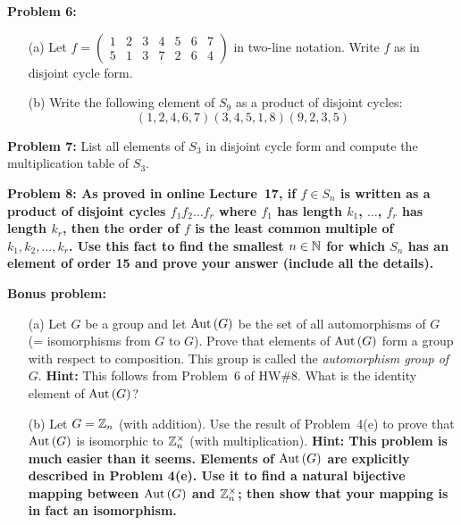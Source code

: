 \documentclass[11pt]{amsart}
\begin{document}
 \skv
{\bf Problem 6:} 
\begin{itemize}
\item[(a)] Let $f=\begin{pmatrix}1 & 2& 3& 4&5 &  6& 7\\
5 & 1& 3& 7&2 &  6& 4 \end{pmatrix}$ in two-line notation. Write $f$ as in disjoint cycle form.

\item[(b)] Write the following element of $S_9$ as a product of disjoint cycles: 
$$(1,2,4,6,7)(3,4,5,1,8)(9,2,3,5)$$
\end{itemize}
\skv

{\bf Problem 7:} List all elements of $S_3$ in disjoint cycle form and compute the multiplication table of $S_3$.
\skv

\skv
\bf{Problem 8: }\rm As proved in online Lecture~17, if $f\in S_n$ is written as a product of
disjoint cycles $f_1 f_2\ldots f_r$ where
$f_1$ has length $k_1$, $\ldots$, $f_r$ has length $k_r$,
then the order of $f$ is the least common multiple
of $k_1, k_2,\ldots, k_r$. Use this fact to find the smallest $n\in{\mathbb N}$ for which $S_n$
has an element of order 15 and prove your answer (include all the details).
\skv

\bf{Bonus problem: }\rm 
\begin{itemize}
\item[(a)] Let $G$ be a group and let ${\rm Aut\,}(G)$ be the set of
all automorphisms of $G$ (= isomorphisms from $G$ to $G$). Prove
that elements of ${\rm Aut\,}(G)$ form a group with respect to composition.
This group is called the {\it automorphism group of $G$}.
{\bf Hint:}  This follows from Problem~6 of HW\#8.
What is the identity element of ${\rm Aut\,}(G)$?

\item[(b)] Let $G={\mathbb Z}_n$ (with addition). Use the result of Problem~4(e)
to prove that ${\rm Aut\,}(G)$ is isomorphic to ${\mathbb Z}_n^{\times}$ (with multiplication).
\bf{Hint: }\rm This problem is much easier than it seems.
Elements of ${\rm Aut\,}(G)$ are explicitly described in Problem 4(e).
Use it to find a natural bijective mapping between ${\rm Aut\,}(G)$
and ${\mathbb Z}_n^{\times}$; then show that your mapping is in fact 
an isomorphism.
\end{itemize}
\end{document}
